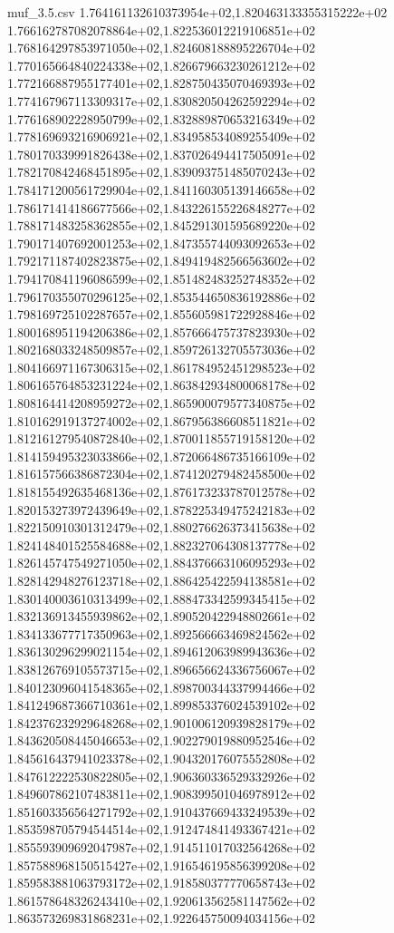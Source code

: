\begin{filecontents*}{muf_3.5.csv}
1.764161132610373954e+02,1.820463133355315222e+02
1.766162787082078864e+02,1.822536012219106851e+02
1.768164297853971050e+02,1.824608188895226704e+02
1.770165664840224338e+02,1.826679663230261212e+02
1.772166887955177401e+02,1.828750435070469393e+02
1.774167967113309317e+02,1.830820504262592294e+02
1.776168902228950799e+02,1.832889870653216349e+02
1.778169693216906921e+02,1.834958534089255409e+02
1.780170339991826438e+02,1.837026494417505091e+02
1.782170842468451895e+02,1.839093751485070243e+02
1.784171200561729904e+02,1.841160305139146658e+02
1.786171414186677566e+02,1.843226155226848277e+02
1.788171483258362855e+02,1.845291301595689220e+02
1.790171407692001253e+02,1.847355744093092653e+02
1.792171187402823875e+02,1.849419482566563602e+02
1.794170841196086599e+02,1.851482483252748352e+02
1.796170355070296125e+02,1.853544650836192886e+02
1.798169725102287657e+02,1.855605981722928846e+02
1.800168951194206386e+02,1.857666475737823930e+02
1.802168033248509857e+02,1.859726132705573036e+02
1.804166971167306315e+02,1.861784952451298523e+02
1.806165764853231224e+02,1.863842934800068178e+02
1.808164414208959272e+02,1.865900079577340875e+02
1.810162919137274002e+02,1.867956386608511821e+02
1.812161279540872840e+02,1.870011855719158120e+02
1.814159495323033866e+02,1.872066486735166109e+02
1.816157566386872304e+02,1.874120279482458500e+02
1.818155492635468136e+02,1.876173233787012578e+02
1.820153273972439649e+02,1.878225349475242183e+02
1.822150910301312479e+02,1.880276626373415638e+02
1.824148401525584688e+02,1.882327064308137778e+02
1.826145747549271050e+02,1.884376663106095293e+02
1.828142948276123718e+02,1.886425422594138581e+02
1.830140003610313499e+02,1.888473342599345415e+02
1.832136913455939862e+02,1.890520422948802661e+02
1.834133677717350963e+02,1.892566663469824562e+02
1.836130296299021154e+02,1.894612063989943636e+02
1.838126769105573715e+02,1.896656624336756067e+02
1.840123096041548365e+02,1.898700344337994466e+02
1.841249687366710361e+02,1.899853376024539102e+02
1.842376232929648268e+02,1.901006120939828179e+02
1.843620508445046653e+02,1.902279019880952546e+02
1.845616437941023378e+02,1.904320176075552808e+02
1.847612222530822805e+02,1.906360336529332926e+02
1.849607862107483811e+02,1.908399501046978912e+02
1.851603356564271792e+02,1.910437669433249539e+02
1.853598705794544514e+02,1.912474841493367421e+02
1.855593909692047987e+02,1.914511017032564268e+02
1.857588968150515427e+02,1.916546195856399208e+02
1.859583881063793172e+02,1.918580377770658743e+02
1.861578648326243410e+02,1.920613562581147562e+02
1.863573269831868231e+02,1.922645750094034156e+02

\end{filecontents*}
